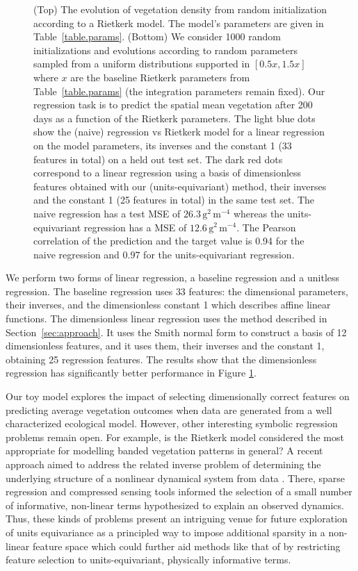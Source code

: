 \documentclass[twoside,11pt]{article}
\newcommand{\sectionname}{Section}
\newcommand{\secref}[1]{\sectionname~\ref{#1}}
\newcommand{\unit}[1]{\mathrm{#1}}
\newcommand{\g}{\unit{g}}
\newcommand{\m}{\unit{m}}
\begin{document}
\begin{figure}[tp]
    \caption{(Top) The evolution of vegetation density from random initialization according to a Rietkerk model. The model's parameters are given in Table~\ref{table.params}. (Bottom) We consider 1000 random initializations and evolutions according to random parameters sampled from a uniform distributions supported in $[0.5x , 1.5x]$ where $x$ are the baseline Rietkerk parameters from Table~\ref{table.params} (the integration parameters remain fixed). Our regression task is to predict the spatial mean vegetation after 200 days as a function of the Rietkerk parameters. The light blue dots show the (naive) regression vs Rietkerk model for a linear regression on the model parameters, its inverses and the constant 1 (33 features in total) on a held out test set. The dark red dots correspond to a linear regression using a basis of dimensionless features obtained with our (units-equivariant) method, their inverses and the constant 1 (25 features in total) in the same test set. The naive regression has a test MSE of  $26.3 \, \g^2 \, \m^{-4}$ whereas the units-equivariant regression has a MSE of $12.6 \, \g^2 \, \m^{-4}$. The Pearson correlation of the prediction and the target value is 0.94 for the naive regression and 0.97 for the units-equivariant regression. }
    \label{fig:vegetation}
\end{figure}
We perform two forms of linear regression, a baseline regression and a unitless regression. The baseline regression uses $33$ features: the dimensional parameters, their inverses, and the dimensionless constant 1 which describes affine linear functions. The dimensionless linear regression uses the method described in \secref{sec:approach}. It uses the Smith normal form to construct a basis of 12 dimensionless features, and it uses them, their inverses and the constant 1, obtaining 25 regression features. The results show that the dimensionless regression has significantly better performance in Figure \ref{fig:vegetation}.

Our toy model explores the impact of selecting dimensionally correct features on predicting average vegetation outcomes when data are generated from a well characterized ecological model. However, other interesting symbolic regression problems remain open.
For example, is the Rietkerk model considered the most appropriate for modelling banded vegetation patterns in general? A recent approach aimed to address the related inverse problem of determining the underlying structure of a nonlinear dynamical system from data \citep{brunton2016discovering}. There, sparse regression and compressed sensing tools informed the selection of a small number of informative, non-linear terms hypothesized to explain an observed dynamics. Thus, these kinds of problems present an intriguing venue for future exploration of units equivariance as a principled way to impose additional sparsity in a non-linear feature space which could further aid methods like that of \citet{brunton2016discovering} by restricting feature selection to units-equivariant, physically informative terms.
\end{document}
